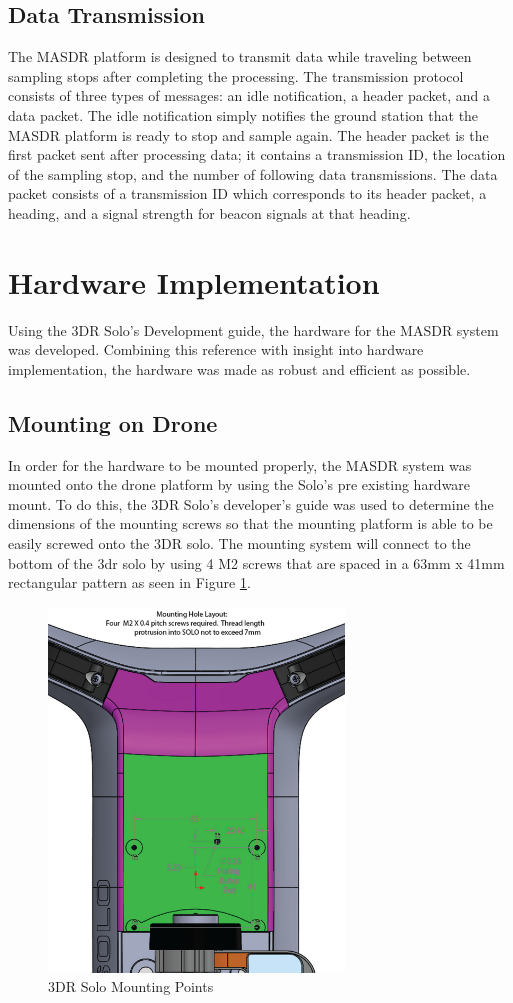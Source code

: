 \subsection{Data Transmission}
The MASDR platform is designed to transmit data while traveling between sampling stops after completing the processing. The transmission protocol consists of three types of messages: an idle notification, a header packet, and a data packet. The idle notification simply notifies the ground station that the MASDR platform is ready to stop and sample again. The header packet is the first packet sent after processing data; it contains a transmission ID, the location of the sampling stop, and the number of following data transmissions. The data packet consists of a transmission ID which corresponds to its header packet, a heading, and a signal strength for beacon signals at that heading.

\section{Hardware Implementation}
Using the 3DR Solo’s Development guide, the hardware for the MASDR system was developed. Combining this reference with insight into hardware implementation, the hardware was made as robust and efficient as possible.
\subsection{Mounting on Drone} \label{Mounting}
In order for the hardware to be mounted properly, the MASDR system was mounted onto the drone platform by using the Solo’s pre existing hardware mount. To do this, the 3DR Solo’s developer's guide was used to determine the dimensions of the mounting screws so that the mounting platform is able to be easily screwed onto the 3DR solo. The mounting system will connect to the bottom of the 3dr solo by using 4 M2 screws that are spaced in a 63mm x 41mm rectangular pattern as seen in Figure \ref{fig:Solo_mount}.
\begin{figure}[ht]
\centering
\includegraphics[width=0.70\textwidth]{img/solo_mount_points.png}
\caption{3DR Solo Mounting Points}
\label{fig:Solo_mount}
\end{figure}
